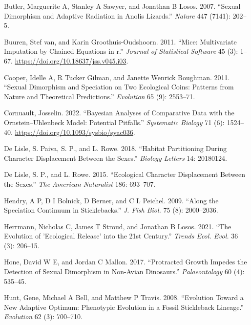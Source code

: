 \documentclass[
  12pt,
]{article}
\newlength{\cslhangindent}
\newlength{\cslentryspacingunit} %
\newenvironment{CSLReferences}[2] %
 {%
  \setlength{\parindent}{0pt}
  \ifodd #1
  \let\oldpar\par
  \def\par{\hangindent=\cslhangindent\oldpar}
  \fi
  \setlength{\parskip}{#2\cslentryspacingunit}
 }%
 {}
\begin{document}
\begin{CSLReferences}{1}{0}
\leavevmode{}%
Butler, Marguerite A, Stanley A Sawyer, and Jonathan B Losos. 2007.
{``Sexual Dimorphism and Adaptive Radiation in Anolis Lizards.''}
\emph{Nature} 447 (7141): 202--5.

\leavevmode{}%
Buuren, Stef van, and Karin Groothuis-Oudshoorn. 2011. {``Mice:
Multivariate Imputation by Chained Equations in r.''} \emph{Journal of
Statistical Software} 45 (3): 1--67.
\url{https://doi.org/10.18637/jss.v045.i03}.

\leavevmode{}%
Cooper, Idelle A, R Tucker Gilman, and Janette Wenrick Boughman. 2011.
{``Sexual Dimorphism and Speciation on Two Ecological Coins: Patterns
from Nature and Theoretical Predictions.''} \emph{Evolution} 65 (9):
2553--71.

\leavevmode{}%
Cornuault, Josselin. 2022. {``Bayesian Analyses of Comparative Data with
the Ornstein--Uhlenbeck Model: Potential Pitfalls.''} \emph{Systematic
Biology} 71 (6): 1524--40. \url{https://doi.org/10.1093/sysbio/syac036}.

\leavevmode{}%
De Lisle, S. Paiva, S. P., and L. Rowe. 2018. {``Habitat Partitioning
During Character Displacement Between the Sexes.''} \emph{Biology
Letters} 14: 20180124.

\leavevmode{}%
De Lisle, S. P., and L. Rowe. 2015. {``Ecological Character Displacement
Between the Sexes.''} \emph{The American Naturalist} 186: 693--707.

\leavevmode{}%
Hendry, A P, D I Bolnick, D Berner, and C L Peichel. 2009. {``Along the
Speciation Continuum in Sticklebacks.''} \emph{J. Fish Biol.} 75 (8):
2000--2036.

\leavevmode{}%
Herrmann, Nicholas C, James T Stroud, and Jonathan B Losos. 2021. {``The
Evolution of 'Ecological Release' into the 21st Century.''} \emph{Trends
Ecol. Evol.} 36 (3): 206--15.

\leavevmode{}%
Hone, David W E, and Jordan C Mallon. 2017. {``Protracted Growth Impedes
the Detection of Sexual Dimorphism in Non-Avian Dinosaurs.''}
\emph{Palaeontology} 60 (4): 535--45.

\leavevmode{}%
Hunt, Gene, Michael A Bell, and Matthew P Travis. 2008. {``Evolution
Toward a New Adaptive Optimum: Phenotypic Evolution in a Fossil
Stickleback Lineage.''} \emph{Evolution} 62 (3): 700--710.


\end{CSLReferences}
\end{document}
